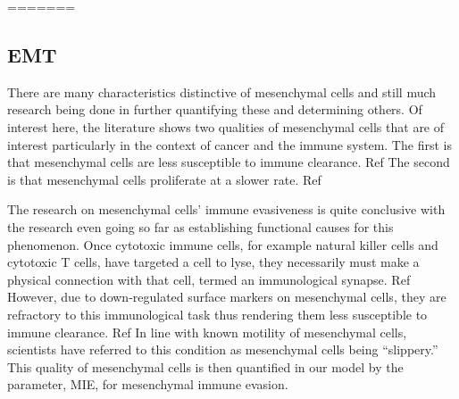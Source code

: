 \documentclass{article}
\begin{document}
%







=======
\subsection{EMT}\label{EMT}
There are many characteristics distinctive of mesenchymal cells and still much research being done in further quantifying these and determining others.
Of interest here, the literature shows two qualities of mesenchymal cells that are of interest particularly in the context of cancer and the immune system.
The first is that mesenchymal cells are less susceptible to immune clearance. Ref 
The second is that mesenchymal cells proliferate at a slower rate. Ref 

The research on mesenchymal cells' immune evasiveness is quite conclusive with the research even going so far as establishing functional causes for this phenomenon.
Once cytotoxic immune cells, for example natural killer cells and cytotoxic T cells, have targeted a cell to lyse, they necessarily must make a physical connection with that cell, termed an immunological synapse. Ref 
However, due to down-regulated surface markers on mesenchymal cells, they are refractory to this immunological task thus rendering them less susceptible to immune clearance. Ref 
In line with known motility of mesenchymal cells, scientists have referred to this condition as mesenchymal cells being ``slippery.''
This quality of mesenchymal cells is then quantified in our model by the parameter, MIE, for mesenchymal immune evasion.
\end{document}
